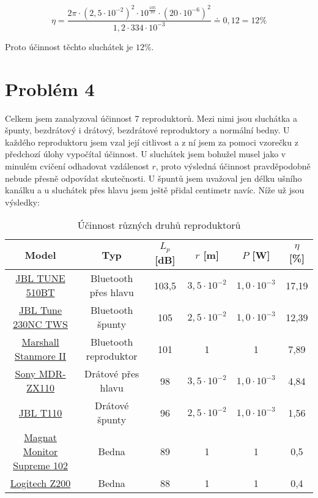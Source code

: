 \documentclass{fkssolpub}
\begin{document}
\[
  \eta = \frac{2 \pi \cdot (2,5 \cdot 10^{-2})^2 \cdot 10^{\frac{105}{10}} \cdot
    (20 \cdot 10^{-6})^2}{1,2 \cdot 334 \cdot 10^{-3}} \doteq 0,12 = 12 \%
\]

Proto účinnost těchto sluchátek je $12\%$.

\clearpage
\section{Problém 4}

Celkem jsem zanalyzoval účinnost 7 reproduktorů. Mezi nimi jsou sluchátka
a špunty, bezdrátový i drátový, bezdrátové reproduktory a normální bedny.
U každého reproduktoru jsem vzal její citlivost a z ní jsem za pomoci
vzorečku z předchozí úlohy vypočítal účinnost. U sluchátek jsem bohužel
musel jako v minulém cvičení odhadovat vzdálenost $r$, proto výsledná účinnost
pravděpodobně nebude přesně odpovídat skutečnosti. U špuntů jsem uvažoval
jen délku ušního kanálku a u sluchátek přes hlavu jsem ještě přidal centimetr
navíc. Níže už jsou výsledky:

\begin{table}[h!]
  \caption{Účinnost různých druhů reproduktorů}
  \label{tab:eff}
  \begin{center}
    \begin{tabular}{|c|c|c|c|c|c|}
      \hline
        Model & Typ & $L_p$ [dB] & $r$ [m] & $P$ [W] & $\eta$ [\%] \\
      \hline
        \href{https://www.harmanaudio.in/on/demandware.static/-/Sites-masterCatalog_Harman/default/dwd36fda61/pdfs/JBL_Tune_510BT_SpecSheet_English.pdf}{JBL TUNE 510BT} & Bluetooth přes hlavu & 103,5 & $3,5 \cdot 10^{-2}$ & $1,0 \cdot 10^{-3}$ & 17,19 \\
        \href{https://www.jbl.com/on/demandware.static/-/Sites-masterCatalog_Harman/default/dw2507ba12/pdfs/JBL_Tune_230NCTWS_SpecSheet_USA_English.pdf}{JBL Tune 230NC TWS} & Bluetooth špunty & 105 & $2,5 \cdot 10^{-2}$ & $1,0 \cdot 10^{-3}$ & 12,39 \\
        \href{https://www.marshallheadphones.com/cz/en/stanmore-ii-bluetooth.html}{Marshall Stanmore II} & Bluetooth reproduktor & 101 & 1 & 1 & 7,89 \\
        \href{https://www.sony.com/electronics/support/wired-headphones-headband/mdr-zx110/specifications}{Sony MDR-ZX110} & Drátové přes hlavu & 98 & $3,5 \cdot 10^{-2}$ & $1,0 \cdot 10^{-3}$ & 4,84 \\
        \href{https://mm.jbl.com/in-ear-headphones/JBL+T110.html}{JBL T110}  & Drátové špunty & 96 & $2,5 \cdot 10^{-2}$ & $1,0 \cdot 10^{-3}$ & 1,56 \\
        \href{https://reprosoustavy-reproduktory.heureka.cz/magnat-monitor-supreme-102/#specifikace/}{Magnat Monitor Supreme 102} & Bedna & 89 & 1 & 1 & 0,5 \\
        \href{https://reprosoustavy-reproduktory.heureka.cz/logitech-z200/#specifikace/}{Logitech Z200} & Bedna & 88 & 1 & 1 & 0,4  \\
      \hline
    \end{tabular}
  \end{center}
\end{table}
\end{document}
